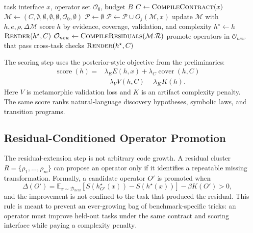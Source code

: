 \documentclass[letterpaper]{article}
\newcommand{\mars}{\textsc{MARS}\xspace}
\begin{document}
\begin{algorithm}[t]
\caption{\mars typed executable hypothesis induction}
\label{alg:mars}
\begin{algorithmic}[1]
\REQUIRE task interface $x$, operator set $\mathcal{O}_0$, budget $B$
\STATE $C \leftarrow \textsc{CompileContract}(x)$
\STATE $\mathcal{M}\leftarrow(C,\emptyset,\emptyset,\emptyset,\emptyset,\mathcal{O}_0,\emptyset)$
  \STATE $\mathcal{P}\leftarrow\emptyset$
    \STATE $\mathcal{P}\leftarrow\mathcal{P}\cup O_j(\mathcal{M},x)$
  \ENDFOR
    \STATE update $\mathcal{M}$ with $h,e,\rho,\Delta\mathcal{M}$
    \STATE score $h$ by evidence, coverage, validation, and complexity
       \STATE $h^\star \leftarrow h$
    \ENDIF
  \ENDFOR
     \RETURN $\textsc{Render}(h^\star,C)$
  \ENDIF
  \STATE $\mathcal{O}_{new}\leftarrow\textsc{CompileResiduals}(\mathcal{M}.\mathcal{R})$
  \STATE promote operators in $\mathcal{O}_{new}$ that pass cross-task checks
\ENDFOR
\RETURN $\textsc{Render}(h^\star,C)$
\end{algorithmic}
\end{algorithm}

The scoring step uses the posterior-style objective from the
preliminaries:
\begin{equation}
\begin{aligned}
  \operatorname{score}(h)
  ={}& \lambda_E E(h,x)
  + \lambda_C \operatorname{cover}(h,C) \\
  &- \lambda_V V(h,C)
  - \lambda_K K(h).
\end{aligned}
\end{equation}
Here $V$ is metamorphic validation loss and $K$ is an artifact complexity
penalty. The same score ranks natural-language discovery hypotheses, symbolic
laws, and transition programs.

\subsection{Residual-Conditioned Operator Promotion}

The residual-extension step is not arbitrary code growth. A residual cluster
$R=\{\rho_1,\ldots,\rho_m\}$ can propose an operator only if it identifies a
repeatable missing transformation. Formally, a candidate operator $O'$ is
promoted when
\begin{equation}
  \Delta(O') =
  \mathbb{E}_{x\sim\mathcal{D}_{held}}
  [S(h^\star_{O'}(x))-S(h^\star(x))]
  -\beta K(O') > 0,
\end{equation}
and the improvement is not confined to the task that produced the residual.
This rule is meant to prevent an ever-growing bag of benchmark-specific tricks:
an operator must improve held-out tasks under the same contract and scoring
interface while paying a complexity penalty.
\end{document}
